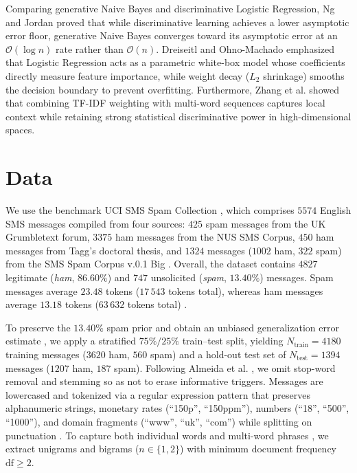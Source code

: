 \documentclass[conference]{IEEEtran}
\begin{document}
Comparing generative Naive Bayes and discriminative Logistic Regression, Ng
and Jordan \cite{NIPS2001_7b7a53e2} proved that while discriminative learning
achieves a lower asymptotic error floor, generative Naive Bayes converges
toward its asymptotic error at an $\mathcal{O}(\log n)$ rate rather than
$\mathcal{O}(n)$. Dreiseitl and Ohno-Machado \cite{DREISEITL2002352}
emphasized that Logistic Regression acts as a parametric white-box model
whose coefficients directly measure feature importance, while weight decay
($L_2$ shrinkage) smooths the decision boundary to prevent overfitting.
Furthermore, Zhang et al. \cite{zhang2011comparative} showed that combining
TF-IDF weighting with multi-word sequences captures local context while
retaining strong statistical discriminative power in high-dimensional spaces.


\section{Data}

We use the benchmark UCI SMS Spam Collection
\cite{10.1145/2034691.2034742, sms_spam_collection_228}, which comprises
$5574$ English SMS messages compiled from four sources: $425$ spam messages
from the UK Grumbletext forum, $3375$ ham messages from the NUS SMS Corpus,
$450$ ham messages from Tagg's doctoral thesis, and $1324$ messages ($1002$
ham, $322$ spam) from the SMS Spam Corpus v.0.1 Big
\cite{10.1145/2034691.2034742}. Overall, the dataset contains $4827$
legitimate (\textit{ham}, $86.60\%$) and $747$ unsolicited (\textit{spam},
$13.40\%$) messages. Spam messages average $23.48$ tokens ($17\,543$ tokens
total), whereas ham messages average $13.18$ tokens ($63\,632$ tokens total)
\cite{10.1145/2034691.2034742}.

To preserve the $13.40\%$ spam prior and obtain an unbiased generalization
error estimate \cite{DREISEITL2002352}, we apply a stratified $75\%/25\%$
train--test split, yielding $N_{\text{train}} = 4180$ training messages
($3620$ ham, $560$ spam) and a hold-out test set of $N_{\text{test}} = 1394$
messages ($1207$ ham, $187$ spam). Following Almeida et al.
\cite{10.1145/2034691.2034742}, we omit stop-word removal and stemming so as
not to erase informative triggers. Messages are lowercased and tokenized via
a regular expression pattern that preserves alphanumeric strings, monetary
rates (``150p'', ``150ppm''), numbers (``18'', ``500'', ``1000''), and domain
fragments (``www'', ``uk'', ``com'') while splitting on punctuation
\cite{10.1145/2034691.2034742}. To capture both individual words and
multi-word phrases \cite{zhang2011comparative}, we extract unigrams and
bigrams ($n \in \{1, 2\}$) with minimum document frequency $\text{df} \ge 2$.
\end{document}
